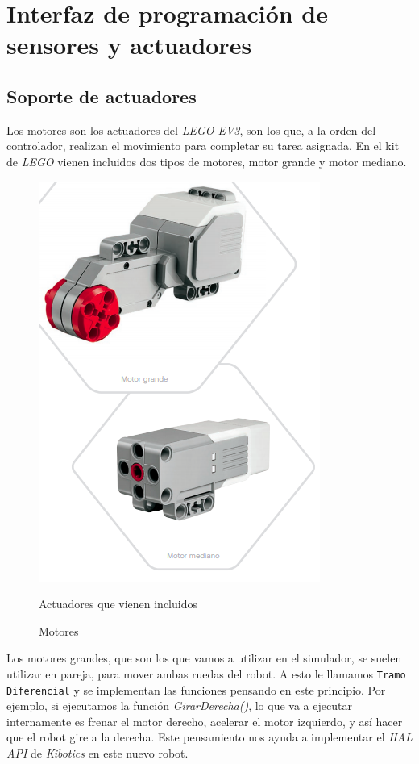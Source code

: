 \section{Interfaz de programación de sensores y actuadores}
\label{sec:interfazsimula}
\subsection{Soporte de actuadores}
Los motores son los actuadores del \textit{LEGO EV3}, son los que, a la orden del controlador, realizan el movimiento para completar su tarea asignada. En el kit de \textit{LEGO} vienen incluidos dos tipos de motores, motor grande y motor mediano.\newline
\begin{figure}
    \centering
    \includegraphics[width=0.6\linewidth]{img/motores.png}
    \caption{Motores}{{\footnotesize Actuadores que vienen incluidos}}
    \label{fig:color}
\end{figure}
 Los motores grandes, que son los que vamos a utilizar en el simulador, se suelen utilizar en pareja, para mover ambas ruedas del robot. A esto le llamamos \texttt{Tramo Diferencial} y se implementan las funciones pensando en este principio. Por ejemplo, si ejecutamos la función \textit{GirarDerecha()}, lo que va a ejecutar internamente es frenar el motor derecho, acelerar el motor izquierdo, y así hacer que el robot gire a la derecha. Este pensamiento nos ayuda a implementar el \textit{HAL API} de \textit{Kibotics} en este nuevo robot.  



